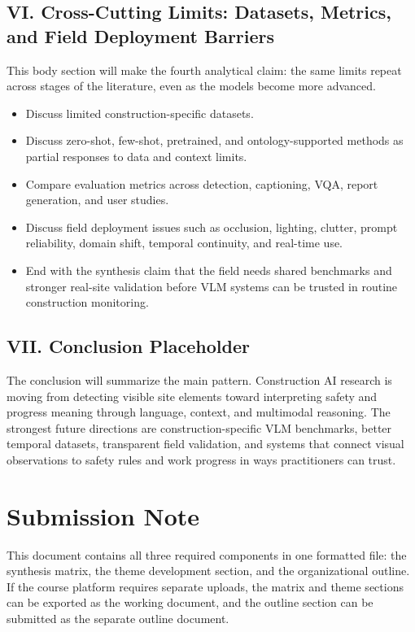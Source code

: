 \documentclass[10pt, letterpaper]{article}
\begin{document}
\subsection{VI. Cross-Cutting Limits: Datasets, Metrics, and Field Deployment Barriers}

This body section will make the fourth analytical claim: the same limits repeat across stages of the literature, even as the models become more advanced.

\begin{itemize}
\item Discuss limited construction-specific datasets.
\item Discuss zero-shot, few-shot, pretrained, and ontology-supported methods as partial responses to data and context limits.
\item Compare evaluation metrics across detection, captioning, VQA, report generation, and user studies.
\item Discuss field deployment issues such as occlusion, lighting, clutter, prompt reliability, domain shift, temporal continuity, and real-time use.
\item End with the synthesis claim that the field needs shared benchmarks and stronger real-site validation before VLM systems can be trusted in routine construction monitoring.
\end{itemize}

\subsection{VII. Conclusion Placeholder}

The conclusion will summarize the main pattern. Construction AI research is moving from detecting visible site elements toward interpreting safety and progress meaning through language, context, and multimodal reasoning. The strongest future directions are construction-specific VLM benchmarks, better temporal datasets, transparent field validation, and systems that connect visual observations to safety rules and work progress in ways practitioners can trust.

\section{Submission Note}

This document contains all three required components in one formatted file: the synthesis matrix, the theme development section, and the organizational outline. If the course platform requires separate uploads, the matrix and theme sections can be exported as the working document, and the outline section can be submitted as the separate outline document.
\end{document}
